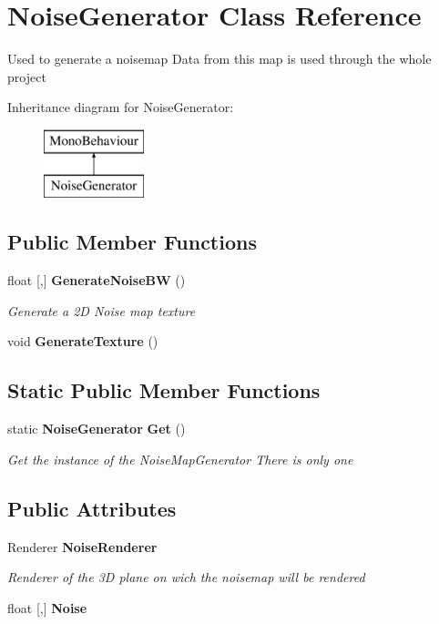 \section{Noise\+Generator Class Reference}
\label{class_noise_generator}


Used to generate a noisemap Data from this map is used through the whole project  


Inheritance diagram for Noise\+Generator\+:\begin{figure}[H]
\begin{center}
\leavevmode
\includegraphics[height=2.000000cm]{class_noise_generator}
\end{center}
\end{figure}
\subsection*{Public Member Functions}
\begin{DoxyCompactItemize}
\item 
float [,] \textbf{ Generate\+Noise\+BW} ()
\begin{DoxyCompactList}\small\item\em Generate a 2D Noise map texture \end{DoxyCompactList}\item 
void \textbf{ Generate\+Texture} ()
\end{DoxyCompactItemize}
\subsection*{Static Public Member Functions}
\begin{DoxyCompactItemize}
\item 
static \textbf{ Noise\+Generator} \textbf{ Get} ()
\begin{DoxyCompactList}\small\item\em Get the instance of the Noise\+Map\+Generator There is only one \end{DoxyCompactList}\end{DoxyCompactItemize}
\subsection*{Public Attributes}
\begin{DoxyCompactItemize}
\item 
Renderer \textbf{ Noise\+Renderer}
\begin{DoxyCompactList}\small\item\em Renderer of the 3D plane on wich the noisemap will be rendered \end{DoxyCompactList}\item 
float [,] \textbf{ Noise}
\end{DoxyCompactItemize}

